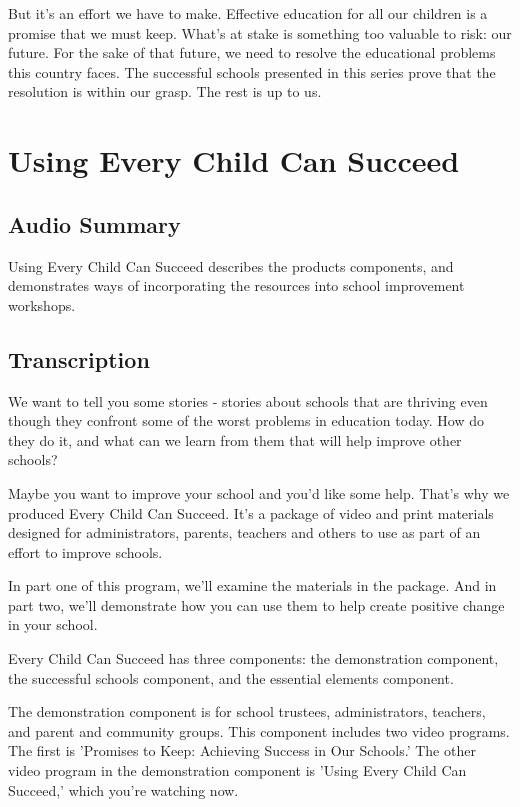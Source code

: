 But it's an effort we have to make.
Effective education for all our children is a promise that we must keep.
What's at stake is something too valuable to risk: our future.
For the sake of that future, we need to resolve the educational problems this country faces.
The successful schools presented in this series prove that the resolution is within our grasp.
The rest is up to us.

\section{Using Every Child Can Succeed}

\subsection{Audio Summary}

Using Every Child Can Succeed describes the products components, and demonstrates ways of incorporating the resources into school improvement workshops.

\subsection{Transcription}

We want to tell you some stories - stories about schools that are thriving even though they confront some of the worst problems in education today.
How do they do it, and what can we learn from them that will help improve other schools?

Maybe you want to improve your school and you'd like some help.
That's why we produced Every Child Can Succeed.
It's a package of video and print materials designed for administrators, parents, teachers and others to use as part of an effort to improve schools.

In part one of this program, we'll examine the materials in the package.
And in part two, we'll demonstrate how you can use them to help create positive change in your school.

Every Child Can Succeed has three components: the demonstration component, the successful schools component, and the essential elements component.

The demonstration component is for school trustees, administrators, teachers, and parent and community groups.
This component includes two video programs.
The first is 'Promises to Keep: Achieving Success in Our Schools.'
The other video program in the demonstration component is 'Using Every Child Can Succeed,' which you're watching now.

